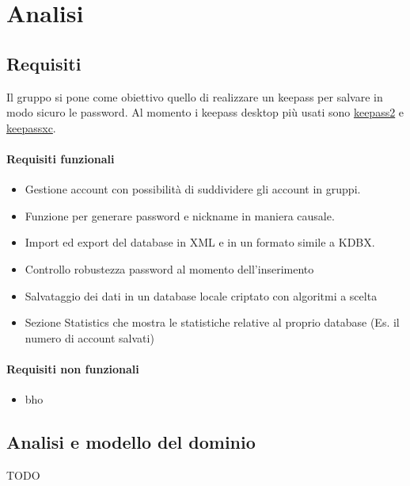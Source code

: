 \documentclass[a4paper,12pt]{report}
\begin{document}
\tableofcontents

\chapter{Analisi}

\section{Requisiti}

Il gruppo si pone come obiettivo quello di realizzare un keepass per salvare
in modo sicuro le password. Al momento i keepass desktop più usati sono
\href{https://keepass.info/}{keepass2} e \href{https://keepassxc.org/}{keepassxc}.

\subsubsection{Requisiti funzionali}
\begin{itemize}
  \item Gestione account con possibilità di suddividere gli account in gruppi.
  \item Funzione per generare password e nickname in maniera causale.
  \item Import ed export del database in XML e in un formato simile a KDBX.
  \item Controllo robustezza password al momento dell'inserimento
  \item Salvataggio dei dati in un database locale criptato con algoritmi a scelta
  \item Sezione Statistics che mostra le statistiche relative al proprio database (Es. il numero di account salvati)
\end{itemize}

\subsubsection{Requisiti non funzionali}
\begin{itemize}
	\item bho
\end{itemize}

\section{Analisi e modello del dominio}

TODO
\end{document}
